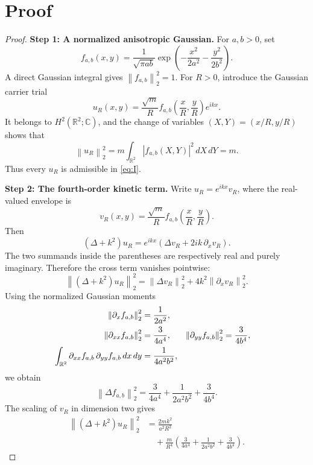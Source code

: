 \documentclass[11pt]{article}
\newcommand{\R}{\mathbb{R}}
\newcommand{\C}{\mathbb{C}}
\newcommand{\norm}[1]{\left\lVert #1\right\rVert}
\begin{document}
\section{Proof}
\begin{proof}
\textbf{Step 1: A normalized anisotropic Gaussian.}
For $a,b>0$, set
\begin{equation}\label{eq:f}
 f_{a,b}(x,y)=\frac{1}{\sqrt{\pi ab}}
 \exp\!\left(-\frac{x^2}{2a^2}-\frac{y^2}{2b^2}\right).
\end{equation}
A direct Gaussian integral gives $\norm{f_{a,b}}_2^2=1$.
For $R>0$, introduce the Gaussian carrier trial
\begin{equation}\label{eq:trial}
 u_R(x,y)=\frac{\sqrt{m}}{R}
 f_{a,b}\!\left(\frac{x}{R},\frac{y}{R}\right)e^{ikx}.
\end{equation}
It belongs to $H^2(\R^2;\C)$, and the change of variables
$(X,Y)=(x/R,y/R)$ shows that
\begin{equation}\label{eq:mass}
 \norm{u_R}_2^2
 =m\int_{\R^2}|f_{a,b}(X,Y)|^2\,dX\,dY=m.
\end{equation}
Thus every $u_R$ is admissible in \eqref{eq:I}.

\medskip
\noindent\textbf{Step 2: The fourth-order kinetic term.}
Write $u_R=e^{ikx}v_R$, where the real-valued envelope is
\[
 v_R(x,y)=\frac{\sqrt m}{R}f_{a,b}\left(\frac{x}{R},\frac{y}{R}\right).
\]
Then
\begin{equation}\label{eq:carrier}
 (\Delta+k^2)u_R
 =e^{ikx}(\Delta v_R+2ik\,\partial_x v_R).
\end{equation}
The two summands inside the parentheses are respectively real and
purely imaginary. Therefore the cross term vanishes pointwise:
\begin{equation}\label{eq:kin-split}
 \norm{(\Delta+k^2)u_R}_2^2
 =\norm{\Delta v_R}_2^2+4k^2\norm{\partial_xv_R}_2^2.
\end{equation}
Using the normalized Gaussian moments
\begin{align}\label{eq:moments}
 \norm{\partial_xf_{a,b}}_2^2&=\frac{1}{2a^2},\\
 \norm{\partial_{xx}f_{a,b}}_2^2&=\frac{3}{4a^4},
 &\norm{\partial_{yy}f_{a,b}}_2^2&=\frac{3}{4b^4},\notag\\
 \int_{\R^2}\partial_{xx}f_{a,b}\,\partial_{yy}f_{a,b}
 \,dx\,dy&=\frac{1}{4a^2b^2},\notag
\end{align}
we obtain
\begin{equation}\label{eq:delta-f}
 \norm{\Delta f_{a,b}}_2^2
 =\frac{3}{4a^4}+\frac{1}{2a^2b^2}+\frac{3}{4b^4}.
\end{equation}
The scaling of $v_R$ in dimension two gives
\begin{equation}\label{eq:kinetic}
 \boxed{\begin{aligned}
 \norm{(\Delta+k^2)u_R}_2^2
 &=\frac{2mk^2}{a^2R^2}\\
 &\quad+\frac{m}{R^4}\left(
 \frac{3}{4a^4}+\frac{1}{2a^2b^2}+\frac{3}{4b^4}\right).
 \end{aligned}}
\end{equation}


\end{proof}
\end{document}
